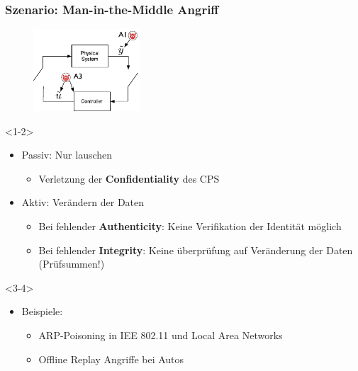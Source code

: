 \documentclass{sikslides}
\begin{document}
    \begin{frame}[t]
        \frametitle{Szenario: Man-in-the-Middle Angriff}
        \begin{overlayarea}{\linewidth}{4cm}
            \begin{figure}
                \centering
                \includegraphics[width=4cm]{figure/mitm}
            \end{figure}
        \end{overlayarea}
        \begin{onlyenv}<1-2>
        \begin{itemize}
            \item Passiv: Nur lauschen
            \begin{itemize}
                \item Verletzung der \textbf{Confidentiality} des CPS
                \pause
            \end{itemize}
            \item Aktiv: Verändern der Daten
            \begin{itemize}
                \item Bei fehlender \textbf{Authenticity}: Keine Verifikation der Identität möglich
                \item Bei fehlender \textbf{Integrity}: Keine überprüfung auf Veränderung der Daten (Prüfsummen!)
            \end{itemize}
            \pause
        \end{itemize}
        \end{onlyenv}

        \begin{onlyenv}<3-4>
        \begin{itemize}
            \item Beispiele:
            \begin{itemize}
                \item ARP-Poisoning in IEE 802.11 und Local Area Networks
                \pause
                \item Offline Replay Angriffe bei Autos
            \end{itemize}
        \end{itemize}
        \end{onlyenv}

    \end{frame}
\end{document}
